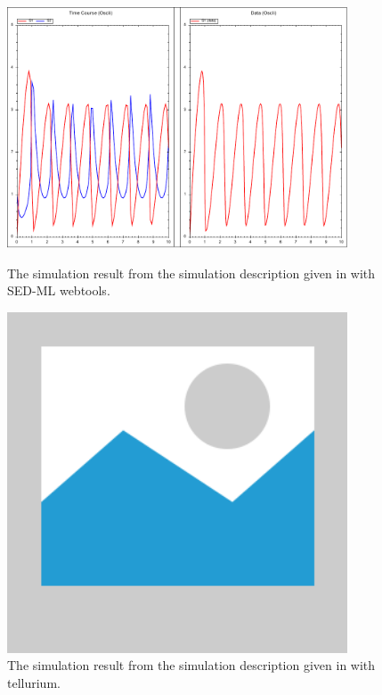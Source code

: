 \begin{figure}
    \centering
    \begin{minipage}{0.45\textwidth}
        \centering
        \includegraphics[width=0.9\textwidth]{examples/plotting-data/results/plotting-data}
        \caption{The simulation result from the simulation description given in  with SED-ML webtools.}
    \end{minipage}\hfill
    \begin{minipage}{0.45\textwidth}
        \centering
        \includegraphics[width=0.9\textwidth]{examples/placeholder}
        \caption{The simulation result from the simulation description given in  with tellurium.}
    \end{minipage}
    \label{fig:plotting-data}
\end{figure}

